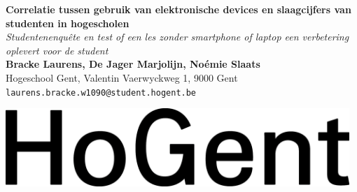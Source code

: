 \documentclass[a0,portrait]{a0poster}
\begin{document}


\begin{minipage}[t]{0.75\linewidth}
\VeryHuge \color{HoGentAccent1} \textbf{Correlatie tussen gebruik van elektronische devices en slaagcijfers van studenten in hogescholen} \color{Black}\\ %
\Huge\textit{Studentenenquête en test of een les zonder smartphone of laptop een verbetering oplevert voor de student}\\[2.4cm] %
\huge \textbf{Bracke Laurens, De Jager Marjolijn, Noémie Slaats}\\[0.5cm] %
\huge Hogeschool Gent, Valentin Vaerwyckweg 1, 9000 Gent\\[0.4cm] %
\Large \texttt{laurens.bracke.w1090@student.hogent.be} \\
\end{minipage}
%
\begin{minipage}[t]{0.25\linewidth}
\includegraphics[width=13cm,right]{figures/HG-woordmerk.jpg} 

\end{minipage}

\vspace{1cm} %

\end{document}
